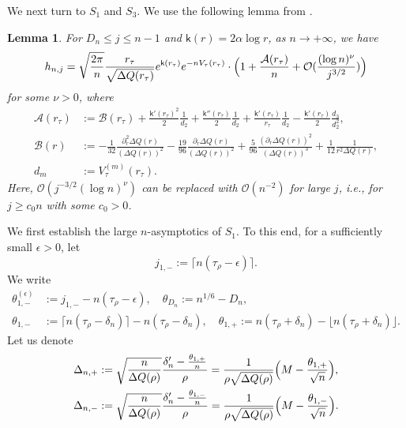 \documentclass[reqno]{amsart}
\newcommand{\1}{\mathds{1}}
\numberwithin{equation}{section}
\newtheorem{lemma}[theorem]{Lemma}
\theoremstyle{definition}
\begin{document}
We next turn to $S_1$ and $S_3$. 
We use the following lemma from \cite[Lemma 4.3]{ACC2023c}.
\begin{lemma}\label{lemma:hnj asymptotics}
For $D_n\leq j\leq n-1$ and $\mathsf{k}(r)=2\alpha\log r$, as $n\to+\infty$, we have 
\begin{equation}
\label{def of Dn leq j leq n-1}
h_{n,j}
=\sqrt{\frac{2\pi}{n}} \frac{r_{\tau}}{\sqrt{\Delta Q(r_{\tau})}}e^{\mathsf{k}(r_{\tau})}e^{-nV_{\tau}(r_{\tau})}\cdot\Bigl(1+\frac{\mathcal{A}(r_{\tau})}{n}+\mathcal{O}(\frac{(\log n)^{\nu}}{j^{3/2}})\Bigr)    
\end{equation}
for some $\nu>0$, where
\begin{align*}
\mathcal{A}(r_{\tau})&:=\mathcal{B}(r_{\tau})+\frac{\mathsf{k}'(r_{\tau})^2}{2}\frac{1}{d_2}+\frac{\mathsf{k}''(r_{\tau})}{2}\frac{1}{d_2}+\frac{\mathsf{k}'(r_{\tau})}{r_{\tau}}\frac{1}{d_2}-\frac{\mathsf{k}'(r_{\tau})}{2}\frac{d_3}{d_2^2},   
\\
\mathcal{B}(r)&:=-\frac{1}{32}\frac{\partial_r^2\Delta Q(r)}{(\Delta Q(r))^2}-\frac{19}{96}\frac{\partial_r\Delta Q(r)}{(\Delta Q(r))^2}+\frac{5}{96}\frac{(\partial_r \Delta Q(r))^2}{(\Delta Q(r))^3}+\frac{1}{12}\frac{1}{r^2\Delta Q(r)},      \\
d_m&:=V_{\tau}^{(m)}(r_{\tau}).
\end{align*}
Here, $\mathcal{O}(j^{-3/2}(\log n)^{\nu})$ can be replaced with $\mathcal{O}(n^{-2})$ for large $j$, i.e., for $j\geq c_0 n$ with some $c_0>0$. 
\end{lemma}
We first establish the large $n$-asymptotics of $S_1$.
To this end, for a sufficiently small $\epsilon>0$, let 
\[
j_{1,-}:=\lceil n(\tau_{\rho}-\epsilon)\rceil.    
\]
We write 
\begin{align*}
\theta_{1,-}^{(\epsilon)}&:=j_{1,-}-n(\tau_{\rho}-\epsilon),
\quad
\theta_{D_n}:=n^{1/6}-D_n, 
\\
\theta_{1,-}&:=\lceil n(\tau_{\rho}-\delta_n)\rceil-n(\tau_{\rho}-\delta_n),\quad
\theta_{1,+}:=n(\tau_{\rho}+\delta_n)-\lfloor n(\tau_{\rho}+\delta_n)\rfloor. 
\end{align*}
Let us denote
\begin{align}
\label{def of Delta nplus}
    \Delta_{n,+}&:=\sqrt{\frac{n}{\Delta Q(\rho)}}\frac{\delta_n'-\tfrac{\theta_{1,+}}{n}}{\rho}=\frac{1}{\rho\sqrt{\Delta Q(\rho)}}\Bigl(M-\frac{\theta_{1,+}}{\sqrt{n}}\Bigr),
    \\
    \label{def of Delta nminus}
    \Delta_{n,-}&:=\sqrt{\frac{n}{\Delta Q(\rho)}}\frac{\delta_n'-\tfrac{\theta_{1,-}}{n}}{\rho}=\frac{1}{\rho\sqrt{\Delta Q(\rho)}}\Bigl(M-\frac{\theta_{1,-}}{\sqrt{n}}\Bigr).
\end{align}
\end{document}
